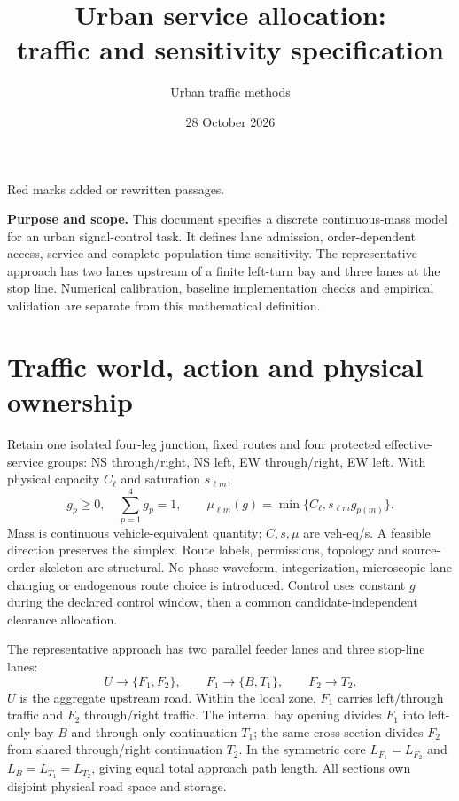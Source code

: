 \documentclass[10pt,a4paper]{article}
\title{Urban service allocation:\\traffic and sensitivity specification}
\author{Urban traffic methods}
\date{28 October 2026}
\begin{document}
\maketitle
{\small\color{revisionred}Red marks added or rewritten passages.}\par

\textbf{Purpose and scope.}
This document specifies a discrete continuous-mass model for an urban
signal-control task. It defines lane admission, order-dependent access,
service and complete population-time sensitivity. The representative
approach has two lanes upstream of a finite left-turn bay and three lanes
at the stop line. Numerical calibration, baseline implementation checks
and empirical validation are separate from this mathematical definition.

\section{Traffic world, action and physical ownership}

Retain one isolated four-leg junction, fixed routes and four protected
effective-service groups: NS through/right, NS left, EW through/right,
EW left. With physical capacity $C_\ell$ and saturation $s_{\ell m}$,
\begin{equation}
 g_p\geq0,\quad \sum_{p=1}^4g_p=1,\qquad
 \mu_{\ell m}(g)=\min\{C_\ell,s_{\ell m}g_{p(m)}\}.
 \label{eq:action}
\end{equation}
Mass is continuous vehicle-equivalent quantity; $C,s,\mu$ are veh-eq/s.
A feasible direction preserves the simplex. Route labels, permissions,
topology and source-order skeleton are structural. No phase waveform,
integerization, microscopic lane changing or endogenous route choice is
introduced. Control uses constant $g$ during the declared control window,
then a common candidate-independent clearance allocation.

The representative approach has two parallel feeder lanes and three
stop-line lanes:
\begin{equation}
 U\longrightarrow\{F_1,F_2\},\qquad
 F_1\longrightarrow\{B,T_1\},\qquad F_2\longrightarrow T_2 .
 \label{eq:geometry}
\end{equation}
$U$ is the aggregate upstream road. Within the local zone, $F_1$ carries
left/through traffic and $F_2$ through/right traffic. The internal bay
opening divides $F_1$ into left-only bay $B$ and through-only continuation
$T_1$; the same cross-section divides $F_2$ from shared through/right
continuation $T_2$. In the symmetric core
$L_{F_1}=L_{F_2}$ and $L_B=L_{T_1}=L_{T_2}$, giving equal total approach
path length. All sections own disjoint physical road space and storage.
\end{document}
